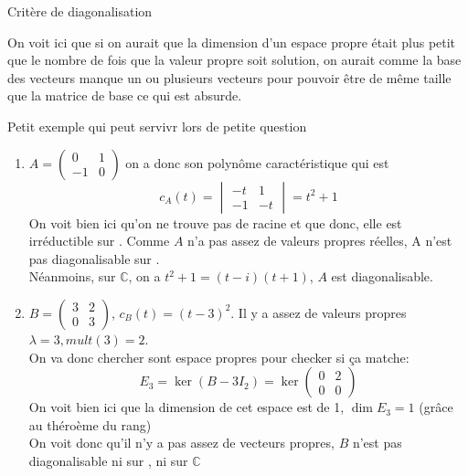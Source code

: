 \begin{parag}{Critère de diagonalisation}
\begin{theoreme}
    \end{theoreme}
    \begin{framedremark}
            On voit ici que si on aurait que la dimension d'un espace propre était plus petit que le nombre de fois que la valeur propre soit solution, on aurait comme la base des vecteurs manque un ou plusieurs vecteurs pour pouvoir être de même taille que la matrice de base ce qui est absurde.
        \end{framedremark}
        \begin{subparag}{Petit exemple qui peut servivr lors de petite question}
        \begin{enumerate}
            \item $A = \begin{pmatrix}
                0 & 1\\ -1 & 0
            \end{pmatrix}$ on a donc son polynôme caractéristique qui est 
            \[c_A(t) = \begin{vmatrix}
                -t & 1\\ -1 & -t
            \end{vmatrix} = t^2 + 1\]
            On voit bien ici qu'on ne trouve pas de racine et que donc, elle est irréductible sur \R. Comme $A$ n'a pas assez de valeurs propres réelles, A n'est pas diagonalisable sur \R.
            \\
            Néanmoins, sur $\mathbb{C}$, on a $t^2 + 1 = (t-i)(t+1)$, $A$ est diagonalisable.
            \item $B = \begin{pmatrix}
                3 & 2\\0 & 3
            \end{pmatrix}$, $c_B(t) = (t-3)^2$. Il y a assez de valeurs propres $\lambda = 3, mult(3) = 2$.
            \\
            On va donc chercher sont espace propres pour checker si ça matche:
            \[E_3 =\ker(B - 3I_2) =  \ker \begin{pmatrix}
                0 & 2\\ 0 & 0
            \end{pmatrix}\]
            On voit bien ici que la dimension de cet espace est de 1, $\dim E_3 = 1$ (grâce au théroème du rang)\\
            On voit donc qu'il n'y a pas assez de vecteurs propres, $B$ n'est pas diagonalisable ni sur \R, ni sur $\mathbb{C}$
        \end{enumerate}
    
            
        \end{subparag}
\end{parag}

